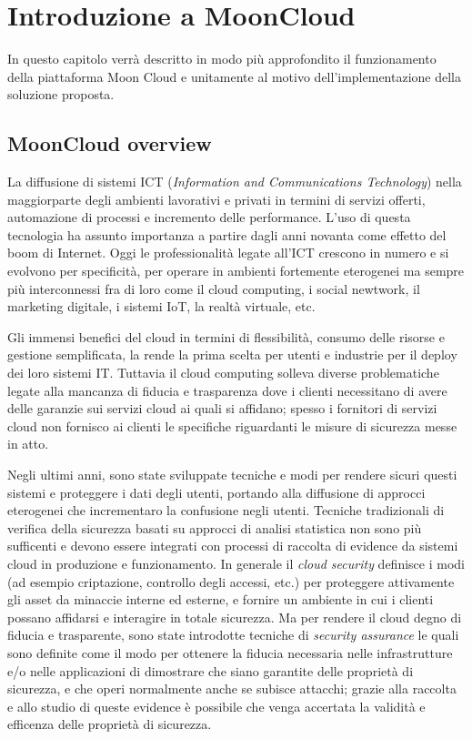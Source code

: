 \chapter{Introduzione a MoonCloud}
In questo capitolo verrà descritto in modo più approfondito il funzionamento della piattaforma Moon Cloud e unitamente al 
motivo dell'implementazione della soluzione proposta.

\section{MoonCloud overview}
La diffusione di sistemi ICT (\textit{Information and Communications Technology}) nella maggiorparte degli ambienti lavorativi 
e privati in termini di servizi offerti, automazione di processi e incremento delle performance. L'uso di questa tecnologia 
ha assunto importanza a partire dagli anni novanta come effetto del boom di Internet.
Oggi le professionalità legate all'ICT crescono in numero e si evolvono per specificità, per operare in ambienti fortemente 
eterogenei ma sempre più interconnessi fra di loro come il cloud computing, i social newtwork, il marketing digitale, i sistemi IoT, 
la realtà virtuale, etc.

Gli immensi benefici del cloud in termini di flessibilità, consumo delle risorse e gestione semplificata, la rende la prima 
scelta per utenti e industrie per il deploy dei loro sistemi IT. Tuttavia il cloud computing solleva diverse problematiche
legate alla mancanza di fiducia e trasparenza dove i clienti necessitano di avere delle garanzie sui servizi cloud ai quali 
si affidano; spesso i fornitori di servizi cloud non fornisco ai clienti le specifiche riguardanti le misure di sicurezza 
messe in atto.

Negli ultimi anni, sono state sviluppate tecniche e modi per rendere sicuri questi sistemi e proteggere i dati degli utenti, 
portando alla diffusione di approcci eterogenei che incrementaro la confusione negli utenti.
Tecniche tradizionali di verifica della sicurezza basati su approcci di analisi statistica non sono più sufficenti e
devono essere integrati con processi di raccolta di evidence da sistemi cloud in produzione e funzionamento. 
In generale il \textit{cloud security} definisce i modi (ad esempio criptazione, controllo degli accessi, etc.) per 
proteggere attivamente gli asset da minaccie interne ed esterne, e fornire un ambiente in cui i clienti possano affidarsi 
e interagire in totale sicurezza. 
Ma per rendere il cloud degno di fiducia e trasparente, sono state introdotte tecniche di \textit{security assurance} le 
quali sono definite come il modo per ottenere la fiducia necessaria nelle infrastrutture e/o nelle applicazioni di 
dimostrare che siano garantite delle proprietà di sicurezza, e che operi normalmente anche se subisce attacchi; grazie alla 
raccolta e allo studio di queste evidence è possibile che venga accertata la validità e efficenza delle proprietà di sicurezza.

